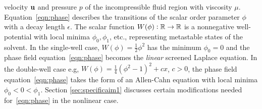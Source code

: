 velocity $\mathbf{u}$ and pressure $p$ of the incompressible fluid region with
viscosity $\mu$. Equation~\eqref{eqn:phase} describes the transitions
of the scalar order parameter $\phi$ with a decay length $\epsilon$.
The scalar function $W(\phi) : \mathbb{R} \to \mathbb{R}$ is a nonnegative
well-potential with local minima $\phi_0, \phi_1$, etc., representing
metastable states of the solvent. In the single-well case, $W(\phi) =
\frac{1}{2}\phi^2$ has the minimum $\phi_0 = 0$ and the phase field
equation~\eqref{eqn:phase} becomes the \emph{linear} screened Laplace
equation. In the double-well case e.g, $W(\phi) =
\frac{1}{4}(\phi^2-1)^2+cx$, $c > 0$, the phase field
equation~\eqref{eqn:phase} takes the form of an Allen-Cahn equation with
local minima $\phi_0 < 0 < \phi_1$. Section \ref{sec:specificaim1}
discusses certain modifications needed for~\eqref{eqn:phase} in the
nonlinear case.

